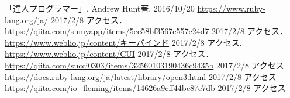 \begin{thebibliography}{9}
 「達人プログラマー」, Andrew Hunt著, 2016/10/20
 \url{https://www.ruby-lang.org/ja/} 2017/2/8 アクセス．
 \url{https://qiita.com/sumyapp/items/5ec58bf3567e557c24d7} 2017/2/8 アクセス．
 \url{https://www.weblio.jp/content/キーバインド} 2017/2/8 アクセス.
 \url{https://www.weblio.jp/content/CUI} 2017/2/8 アクセス．
 \url{https://qiita.com/succi0303/items/32560103190436c9435b} 2017/2/8 アクセス
 \url{https://docs.ruby-lang.org/ja/latest/library/open3.html} 2017/2/8 アクセス
 \url{https://qiita.com/io_fleming/items/14626a9cff44bc87e7db} 2017/2/8 アクセス
\end{thebibliography}    